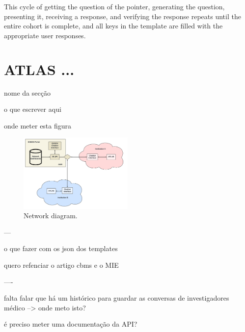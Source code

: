 This cycle of getting the question of the pointer, generating the question, presenting it, receiving a response, and verifying the response repeats until the entire cohort is complete, and all keys in the template are filled with the appropriate user responses.




\section{ATLAS ...}


nome da secção

o que escrever aqui

onde meter esta figura

\begin{figure}[H]
  \includegraphics[width=0.5\textwidth]{figs/chapter4/network_diagram.png}
  \centering
  \caption{Network diagram.}
  \label{fig_network}
\end{figure}


---

o que fazer com os json dos templates

quero refenciar o artigo cbms e o MIE


----

falta falar que há um histórico para guardar as conversas de investigadores médico --> onde meto isto?

é preciso meter uma documentação da API?